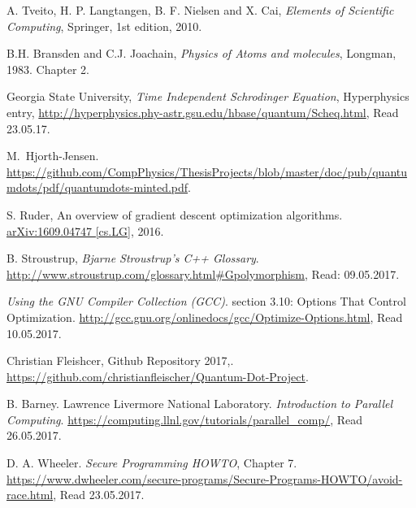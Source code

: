 \documentclass[../main.tex]{subfiles}
\begin{document}
\begin{thebibliography}{99}
 A. Tveito, H. P. Langtangen, B. F. Nielsen and X. Cai, \emph{Elements of Scientific Computing}, Springer, 1st edition, 2010.

 B.H. Bransden and C.J. Joachain, \emph{Physics of Atoms and molecules}, Longman, 1983. Chapter
2.

 Georgia State University, \emph{Time Independent Schrodinger Equation}, Hyperphysics entry, \url{http://hyperphysics.phy-astr.gsu.edu/hbase/quantum/Scheq.html}, Read 23.05.17.


 M.~Hjorth-Jensen. \url{https://github.com/CompPhysics/ThesisProjects/blob/master/doc/pub/quantumdots/pdf/quantumdots-minted.pdf}.


 S. Ruder, An overview of gradient descent optimization
algorithms. \href{https://arxiv.org/abs/1609.04747}{arXiv:1609.04747 [cs.LG]}, 2016.


 B. Stroustrup, \emph{Bjarne Stroustrup's C++ Glossary}.  \url{http://www.stroustrup.com/glossary.html#Gpolymorphism}, Read: 09.05.2017.

 \emph{Using the GNU Compiler Collection (GCC)}. section 3.10: Options That Control Optimization. \url{http://gcc.gnu.org/onlinedocs/gcc/Optimize-Options.html}, Read 10.05.2017.

 Christian Fleishcer, Github Repository 2017,. \url{https://github.com/christianfleischer/Quantum-Dot-Project}.

 B. Barney. Lawrence Livermore National Laboratory. \emph{Introduction to Parallel Computing}. \url{https://computing.llnl.gov/tutorials/parallel_comp/}, Read 26.05.2017.

 D. A. Wheeler. \emph{Secure Programming HOWTO}, Chapter 7.  \url{https://www.dwheeler.com/secure-programs/Secure-Programs-HOWTO/avoid-race.html}, Read 23.05.2017.


\end{thebibliography}
\end{document}
